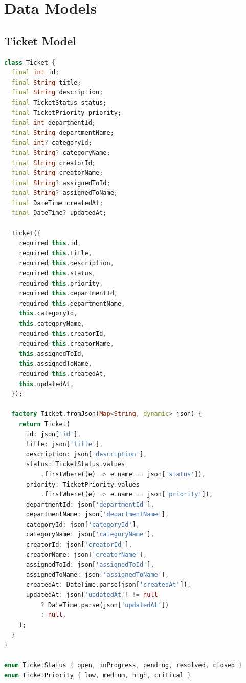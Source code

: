 \documentclass[12pt,a4paper]{article}
\begin{document}
\newpage

\section{Data Models}

\subsection{Ticket Model}

\begin{lstlisting}[language=Dart]
class Ticket {
  final int id;
  final String title;
  final String description;
  final TicketStatus status;
  final TicketPriority priority;
  final int departmentId;
  final String departmentName;
  final int? categoryId;
  final String? categoryName;
  final String creatorId;
  final String creatorName;
  final String? assignedToId;
  final String? assignedToName;
  final DateTime createdAt;
  final DateTime? updatedAt;
  
  Ticket({
    required this.id,
    required this.title,
    required this.description,
    required this.status,
    required this.priority,
    required this.departmentId,
    required this.departmentName,
    this.categoryId,
    this.categoryName,
    required this.creatorId,
    required this.creatorName,
    this.assignedToId,
    this.assignedToName,
    required this.createdAt,
    this.updatedAt,
  });
  
  factory Ticket.fromJson(Map<String, dynamic> json) {
    return Ticket(
      id: json['id'],
      title: json['title'],
      description: json['description'],
      status: TicketStatus.values
          .firstWhere((e) => e.name == json['status']),
      priority: TicketPriority.values
          .firstWhere((e) => e.name == json['priority']),
      departmentId: json['departmentId'],
      departmentName: json['departmentName'],
      categoryId: json['categoryId'],
      categoryName: json['categoryName'],
      creatorId: json['creatorId'],
      creatorName: json['creatorName'],
      assignedToId: json['assignedToId'],
      assignedToName: json['assignedToName'],
      createdAt: DateTime.parse(json['createdAt']),
      updatedAt: json['updatedAt'] != null 
          ? DateTime.parse(json['updatedAt']) 
          : null,
    );
  }
}

enum TicketStatus { open, inProgress, pending, resolved, closed }
enum TicketPriority { low, medium, high, critical }
\end{lstlisting}
\end{document}
